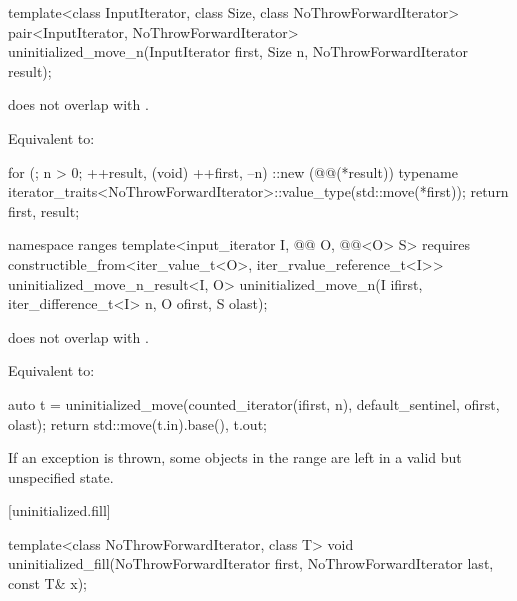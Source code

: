 %
\begin{itemdecl}
template<class InputIterator, class Size, class NoThrowForwardIterator>
  pair<InputIterator, NoThrowForwardIterator>
    uninitialized_move_n(InputIterator first, Size n, NoThrowForwardIterator result);
\end{itemdecl}

\begin{itemdescr}
\pnum
\expects
{} does not overlap with .

\pnum
\effects
Equivalent to:
\begin{codeblock}
for (; n > 0; ++result, (void) ++first, --n)
  ::new (@@(*result))
    typename iterator_traits<NoThrowForwardIterator>::value_type(std::move(*first));
return {first, result};
\end{codeblock}
\end{itemdescr}

%
\begin{itemdecl}
namespace ranges {
  template<input_iterator I, @@ O, @@<O> S>
      requires constructible_from<iter_value_t<O>, iter_rvalue_reference_t<I>>
    uninitialized_move_n_result<I, O>
      uninitialized_move_n(I ifirst, iter_difference_t<I> n, O ofirst, S olast);
}
\end{itemdecl}

\begin{itemdescr}
\pnum
\expects
{} does not overlap with .

\pnum
\effects
Equivalent to:
\begin{codeblock}
auto t = uninitialized_move(counted_iterator(ifirst, n),
                            default_sentinel, ofirst, olast);
return {std::move(t.in).base(), t.out};
\end{codeblock}

\pnum
\begin{note}
If an exception is thrown, some objects in the range
are left in a valid but unspecified state.
\end{note}
\end{itemdescr}

[uninitialized.fill]{}

%
\begin{itemdecl}
template<class NoThrowForwardIterator, class T>
  void uninitialized_fill(NoThrowForwardIterator first, NoThrowForwardIterator last, const T& x);
\end{itemdecl}

